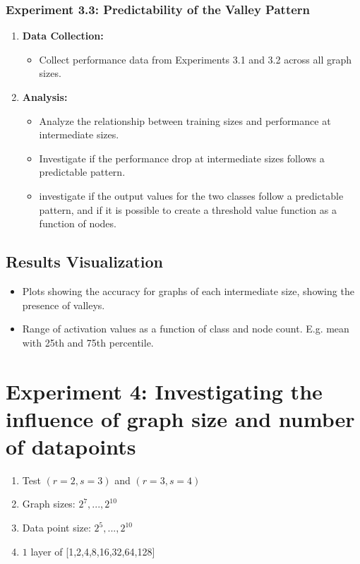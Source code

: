 \subsubsection{Experiment 3.3: Predictability of the Valley Pattern}

\begin{enumerate}
    \item \textbf{Data Collection:}
    \begin{itemize}
        \item Collect performance data from Experiments 3.1 and 3.2 across all graph sizes.
    \end{itemize}

    \item \textbf{Analysis:}
    \begin{itemize}
        \item Analyze the relationship between training sizes and performance at intermediate sizes.
        \item Investigate if the performance drop at intermediate sizes follows a predictable pattern.
        \item investigate if the output values for the two classes follow a predictable pattern, and if it is possible to create a threshold value function as a function of nodes.
    \end{itemize}
    

\end{enumerate}

\subsection{Results Visualization}
\begin{itemize}
    \item Plots showing the accuracy for graphs of each intermediate size, showing the presence of valleys.
    \item Range of activation values as a function of class and node count. E.g. mean with 25th and 75th percentile.
\end{itemize}
 
\section{Experiment 4: Investigating the influence of graph size and number of datapoints}

\begin{enumerate}
    \item Test $(r=2,s=3)$ and $(r=3,s=4)$
    \item Graph sizes: $2^7,...,2^10$
    \item Data point size: $2^5,...,2^10$
    \item $1$ layer of [1,2,4,8,16,32,64,128] 
\end{enumerate}

